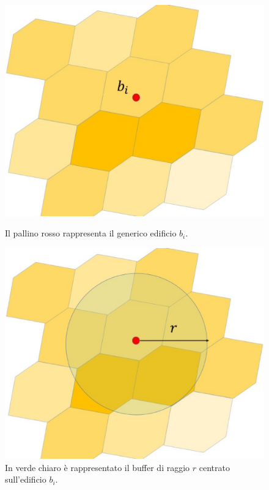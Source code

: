 \begin{enumerate}
	\begin{figure}[h]
		\hspace{0.1\linewidth}
		\begin{minipage}[t]{0.35\linewidth}
			\centering
			\includegraphics[width=1\textwidth]{images/station}
			\caption{Il pallino rosso rappresenta il generico edificio $b_i$.}
			\label{station}
		\end{minipage}
		\hspace{0.13\linewidth}
		\begin{minipage}[t]{0.35\linewidth}
			\centering
			\includegraphics[width=1\textwidth]{images/buffer}
			\caption{In verde chiaro \`e rappresentato il buffer di raggio $r$ centrato  sull'edificio $b_i$. }
			\label{buffer}
		\end{minipage}
	\end{figure}
	

\end{enumerate}
